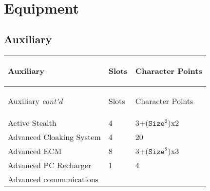 \documentclass[twoside]{book}
\begin{document}
    

\section{Equipment}
    
    

\subsection{Auxiliary}
    
\begin{longtable}{p{1.25in}ll} 
  Auxiliary
  &
  \begin{turn}{70}{Slots}\end{turn}
          
  &
  \begin{turn}{70}{Character Points}\end{turn}
          
  \\
  \hline
  \hline
  \endfirsthead
  Auxiliary \textit{cont'd}
        
  &
  \begin{turn}{70}{Slots}\end{turn}
          
  &
  \begin{turn}{70}{Character Points}\end{turn}
          
  \\
  \endhead
      
  \raggedright
           Active Stealth 
  &
   4 
  &
   3+(\begin{math}{\texttt{Size}}^{2}\end{math})x2
           
  \tabularnewline
  \hline
      
  \raggedright
           Advanced Cloaking System
           
  &
   4 
  &
   20 
  \tabularnewline
  \hline
      
  \raggedright
           Advanced ECM 
  &
   8 
  &
   3+(\begin{math}{\texttt{Size}}^{2}\end{math})x3
           
  \tabularnewline
  \hline
      
  \raggedright
           Advanced PC Recharger 
  &
   1 
  &
   4 
  \tabularnewline
  \hline
      
  \raggedright
           Advanced communications
           

\end{longtable}
\end{document}
